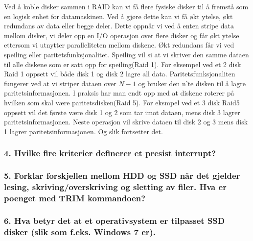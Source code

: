 \documentclass[11pt]{article}
\begin{document}
Ved å koble disker sammen i RAID kan vi få flere fysiske disker til å fremstå som en logisk enhet for datamaskinen. Ved å gjøre dette kan vi få økt ytelse, økt redundans av data eller begge deler. Dette oppnår vi ved å enten stripe data mellom disker, vi deler opp en I/O operasjon over flere disker og får økt ytelse ettersom vi utnytter paralleliteten mellom diskene. Økt redundans får vi ved speiling eller paritetsfunksjonalitet. Speiling vil si at vi skriver den samme dataen til alle diskene som er satt opp for speiling(Raid 1). For eksempel ved et 2 disk Raid 1 oppsett vil både disk 1 og disk 2 lagre all data. Paritetsfunksjonaliten fungerer ved at vi striper dataen over $N - 1$ og bruker den n'te disken til å lagre paritetsinformasjonen. I praksis har man endt opp med at diskene roterer på hvilken som skal være paritetsdisken(Raid 5). For eksmpel ved et 3 disk Raid5 oppsett vil det første være disk 1 og 2 som tar imot dataen, mens disk 3 lagrer paritetsinformasjonen. Neste operasjon vil skrive dataen til disk 2 og 3 mens disk 1 lagrer paritetsinformasjonen. Og slik fortsetter det.  
\subsubsection{4. Hvilke fire kriterier definerer et presist interrupt?}
\subsubsection{5. Forklar forskjellen mellom HDD og SSD når det gjelder lesing, skriving/overskriving og sletting av filer. Hva er poenget med TRIM kommandoen?}
\subsubsection{6. Hva betyr det at et operativsystem er tilpasset SSD disker (slik som f.eks. Windows 7 er).}
\end{document}
